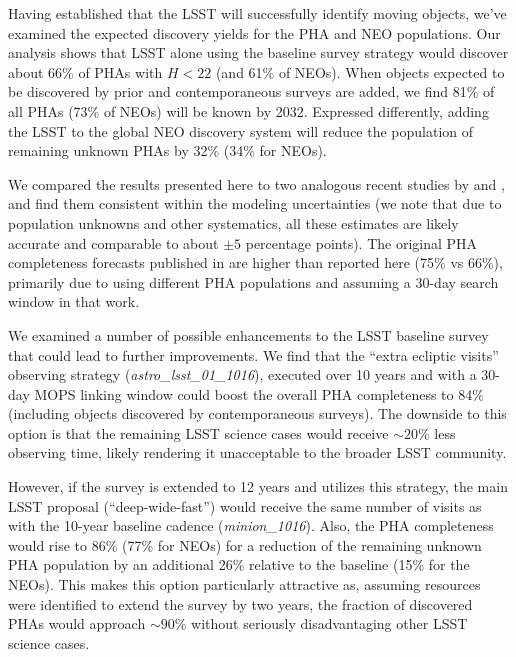
Having established that the LSST will successfully identify moving objects, we've examined the expected discovery yields for the PHA and NEO populations. Our analysis shows that LSST alone using the baseline survey strategy would discover about 66\% of PHAs with $H<22$ (and 61\% of NEOs). When objects expected to be discovered by prior and contemporaneous surveys are added, we find 81\% of all PHAs (73\% of NEOs) will be known by 2032. Expressed differently, adding the LSST to the global NEO discovery system will reduce the population of remaining unknown PHAs by 32\% (34\% for NEOs).

We compared the results presented here to two analogous recent studies by \citet[]{GMS2016} and \citet{VeresChesley2017neo}, and find them consistent within the modeling uncertainties (we note that due to population unknowns and other systematics, all these estimates are likely accurate and comparable to about $\pm 5$ percentage points). The original PHA completeness forecasts published in \cite{IvezicNEO2007} are higher than reported here (75\% vs 66\%), primarily due to using different PHA populations and assuming a 30-day search window in that work.

We examined a number of possible enhancements to the LSST baseline survey that could lead to further improvements. We find that the ``extra ecliptic visits'' observing strategy ({\it astro\_lsst\_01\_1016}), executed over 10 years and with a 30-day MOPS linking window could boost the overall PHA completeness to 84\% (including objects discovered by contemporaneous surveys). The downside to this option is that the remaining LSST science cases would receive $\sim 20$\% less observing time, likely rendering it unacceptable to the broader LSST community. 

However, if the survey is extended to 12 years and utilizes this strategy, the main LSST proposal (``deep-wide-fast'') would receive the same number of visits as with the 10-year baseline cadence ({\it minion\_1016}). Also, the PHA completeness would rise to 86\% (77\% for NEOs) for a reduction of the remaining unknown PHA population by an additional 26\% relative to the baseline (15\% for the NEOs). This makes this option particularly attractive as, assuming resources were identified to extend the survey by two years, the fraction of discovered PHAs would approach $\sim 90$\% without seriously disadvantaging other LSST science cases.
